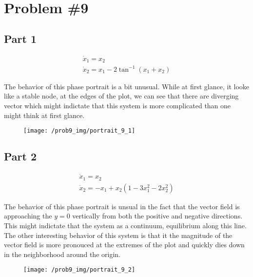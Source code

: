 \section*{Problem \#9}

\subsection*{Part 1}

$$
\begin{array}{l}
\dot{x}_{1}=x_{2} \\
\dot{x}_{2}=x_{1}-2 \tan ^{-1}\left(x_{1}+x_{2}\right)
\end{array}
$$

\noindent The behavior of this phase portrait is a bit unusual. While at first glance, it looke like a stable node, at the edges of the plot, we can see that there are diverging vector which might indictate that this system is more complicated than one might think at first glance.


\begin{figure}[h]
  \centering
  \texttt{[image: /prob9\_img/portrait\_9\_1]}
\end{figure}

\subsection*{Part 2}

$$
\begin{array}{l}
\dot{x}_{1}=x_{2} \\
\dot{x}_{2}=-x_{1}+x_{2}\left(1-3 x_{1}^{2}-2 x_{2}^{2}\right)
\end{array}
$$

\noindent The behavior of this phase portrait is unsual in the fact that the vector field is approaching the $y = 0$ vertically from both the positive and negative directions. This might indictate that the system as a continuum, equilibrium along this line. The other interesting behavior of this system is that it the magnitude of the vector field is more pronouced at the extremes of the plot and quickly dies down in the neighborhood around the origin.

\begin{figure}[h]
  \centering
  \texttt{[image: /prob9\_img/portrait\_9\_2]}
\end{figure}



